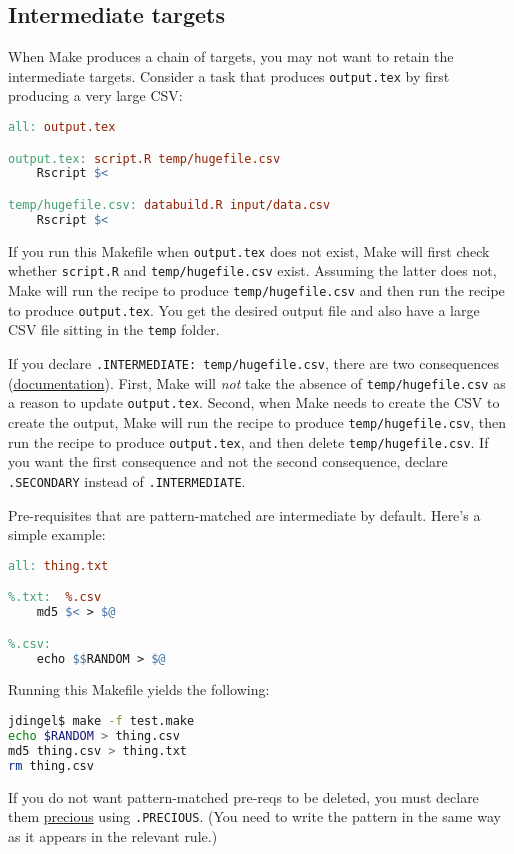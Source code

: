 \subsection{Intermediate targets}

When Make produces a chain of targets, you may not want to retain the intermediate targets.
Consider a task that produces \texttt{output.tex} by first producing a very large CSV:
\begin{lstlisting}[language=make]
all: output.tex

output.tex: script.R temp/hugefile.csv
	Rscript $<

temp/hugefile.csv: databuild.R input/data.csv
	Rscript $<
\end{lstlisting}
If you run this Makefile when \texttt{output.tex} does not exist,
Make will first check whether \texttt{script.R} and \texttt{temp/hugefile.csv} exist.
Assuming the latter does not,
Make will run the recipe to produce \texttt{temp/hugefile.csv}
and
then run the recipe to produce \texttt{output.tex}.
You get the desired output file and also have a large CSV file sitting in the \texttt{temp} folder.

If you declare \texttt{.INTERMEDIATE: temp/hugefile.csv},
there are two consequences (\href{https://www.gnu.org/software/make/manual/html_node/Chained-Rules.html}{documentation}).
First, Make will \textit{not} take the absence of \texttt{temp/hugefile.csv}
as a reason to update \texttt{output.tex}.
Second, when Make needs to create the CSV to create the output,
Make will run the recipe to produce \texttt{temp/hugefile.csv},
then run the recipe to produce \texttt{output.tex},
and
then delete \texttt{temp/hugefile.csv}.
If you want the first consequence and not the second consequence,
declare \texttt{.SECONDARY} instead of \texttt{.INTERMEDIATE}.

Pre-requisites that are pattern-matched are intermediate by default.
Here's a simple example:
\begin{lstlisting}[language=make]
all: thing.txt

%.txt:  %.csv
	md5 $< > $@

%.csv:
	echo $$RANDOM > $@
\end{lstlisting}
Running this Makefile yields the following:
\begin{lstlisting}[language=bash]
jdingel$ make -f test.make 
echo $RANDOM > thing.csv
md5 thing.csv > thing.txt
rm thing.csv
\end{lstlisting}
If you do not want pattern-matched pre-reqs to be deleted,
you must declare them \href{https://www.gnu.org/software/make/manual/html_node/Special-Targets.html}{precious} using \texttt{.PRECIOUS}.
(You need to write the pattern in the same way as it appears in the relevant rule.)

